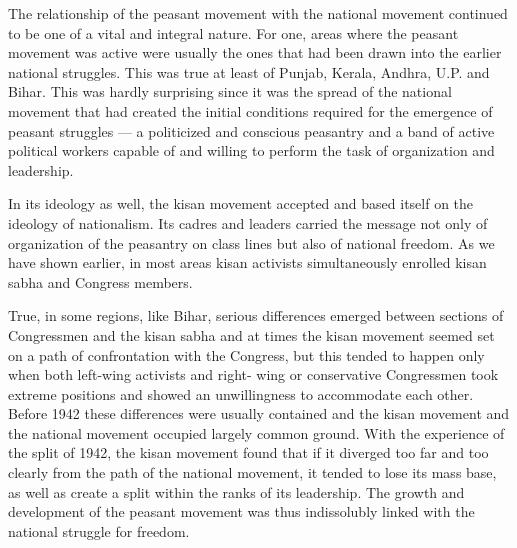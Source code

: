 \begin{multicols}{2}
The relationship of the peasant movement with the national movement continued to be one of a vital and integral nature. For one, areas where the peasant movement was active were usually the ones that had been drawn into the earlier national struggles. This was true at least of Punjab, Kerala, Andhra, U.P. and Bihar. This was hardly surprising since it was the spread of the national movement that had created the initial conditions required for the emergence of peasant struggles --- a politicized and conscious peasantry and a band of active political workers capable of and willing to perform the task of organization and leadership.

In its ideology as well, the kisan movement accepted and based itself on the ideology of nationalism. Its cadres and leaders carried the message not only of organization of the peasantry on class lines but also of national freedom. As we have shown earlier, in most areas kisan activists simultaneously enrolled kisan sabha and Congress members.

True, in some regions, like Bihar, serious differences emerged between sections of Congressmen and the kisan sabha and at times the kisan movement seemed set on a path of confrontation with the Congress, but this tended to happen only when both left-wing activists and right- wing or conservative Congressmen took extreme positions and showed an unwillingness to accommodate each other. Before 1942 these differences were usually contained and the kisan movement and the national movement occupied largely common ground. With the experience of the split of 1942, the kisan movement found that if it diverged too far and too clearly from the path of the national movement, it tended to lose its mass base, as well as create a split within the ranks of its leadership. The growth and development of the peasant movement was thus indissolubly linked with the national struggle for freedom.
\end{multicols}
